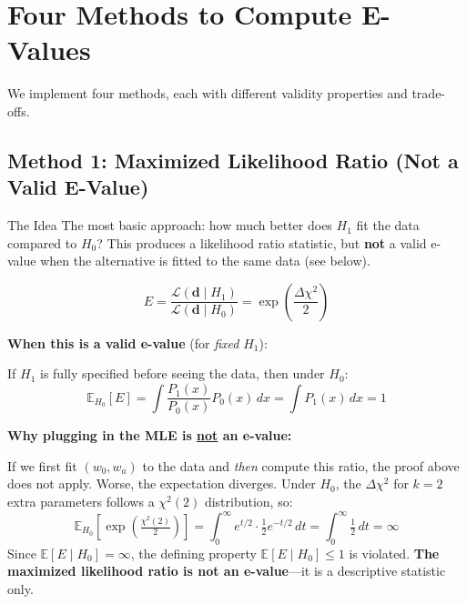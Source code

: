 \documentclass[11pt,a4paper]{article}
\newcommand{\E}{\mathbb{E}}
\begin{document}
\section{Four Methods to Compute E-Values}
\label{sec:methods}

We implement four methods, each with different validity properties and trade-offs.

\subsection{Method 1: Maximized Likelihood Ratio (Not a Valid E-Value)}

\begin{conceptbox}{The Idea}
The most basic approach: how much better does $H_1$ fit the data compared to $H_0$? This produces a likelihood ratio statistic, but \textbf{not} a valid e-value when the alternative is fitted to the same data (see below).
\end{conceptbox}

\begin{equation}
E = \frac{\mathcal{L}(\mathbf{d} \mid H_1)}{\mathcal{L}(\mathbf{d} \mid H_0)} = \exp\!\left(\frac{\Delta\chi^2}{2}\right)
\label{eq:lr_evalue}
\end{equation}

\textbf{When this is a valid e-value} (for \textit{fixed} $H_1$):

If $H_1$ is fully specified before seeing the data, then under $H_0$:
\begin{equation}
\E_{H_0}[E] = \int \frac{P_1(x)}{P_0(x)} P_0(x) \, dx = \int P_1(x) \, dx = 1
\end{equation}

\textbf{Why plugging in the MLE is \underline{not} an e-value:}

If we first fit $(w_0, w_a)$ to the data and \textit{then} compute this ratio, the proof above does not apply. Worse, the expectation diverges. Under $H_0$, the $\Delta\chi^2$ for $k=2$ extra parameters follows a $\chi^2(2)$ distribution, so:
\begin{equation}
\E_{H_0}\!\left[\exp\!\left(\tfrac{\chi^2(2)}{2}\right)\right] = \int_0^\infty e^{t/2}\cdot\tfrac{1}{2}e^{-t/2}\,dt = \int_0^\infty \tfrac{1}{2}\,dt = \infty
\end{equation}
Since $\E[E \mid H_0] = \infty$, the defining property $\E[E \mid H_0] \leq 1$ is violated. \textbf{The maximized likelihood ratio is not an e-value}---it is a descriptive statistic only.
\end{document}
